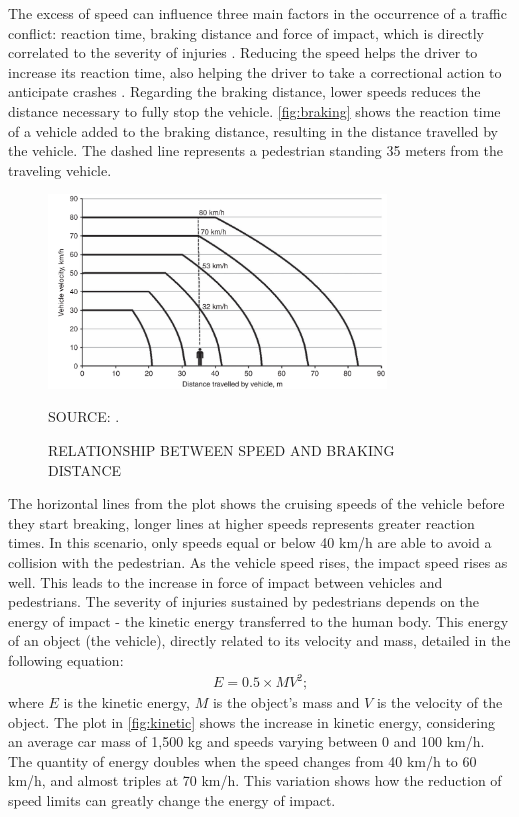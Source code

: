 The excess of speed can influence three main factors in the occurrence of a traffic conflict: reaction time, braking distance and force of impact, which is directly correlated to the severity of injuries \cite{Mohan2016a}. Reducing the speed helps the driver to increase its reaction time, also helping the driver to take a correctional action to anticipate crashes \cite{Elvik2009}. Regarding the braking distance, lower speeds reduces the distance necessary to fully stop the vehicle. \autoref{fig:braking} shows the reaction time of a vehicle added to the braking distance, resulting in the distance travelled by the vehicle. The dashed line represents a pedestrian standing 35 meters from the traveling vehicle. 

\begin{figure}[!htbp]
    \centering\footnotesize
    \captionsetup{font=footnotesize}
    \caption{RELATIONSHIP BETWEEN SPEED AND BRAKING DISTANCE}
    \includegraphics[width=0.8\textwidth]{fig/braking2.png}
    \label{fig:braking}
    \par SOURCE: \textcite{Mohan2016a}.
\end{figure} 

The horizontal lines from the plot shows the cruising speeds of the vehicle before they start breaking, longer lines at higher speeds represents greater reaction times. In this scenario, only speeds equal or below 40 km/h are able to avoid a collision with the pedestrian. As the vehicle speed rises, the impact speed rises as well. This leads to the increase in force of impact between vehicles and pedestrians. The severity of injuries sustained by pedestrians depends on the energy of impact - the kinetic energy transferred to the human body. This energy of an object (the vehicle), directly related to its velocity and mass, detailed in the following equation: \begin{align}
    E = 0.5 \times MV^2 \mbox{;}
    \label{eq:energy}
\end{align} where $E$ is the kinetic energy, $M$ is the object's mass and $V$ is the velocity of the object. The plot in \autoref{fig:kinetic} shows the increase in kinetic energy, considering an average car mass of 1,500 kg \cite{Zervas2008} and speeds varying between 0 and 100 km/h. The quantity of energy doubles when the speed changes from 40 km/h to 60 km/h, and almost triples at 70 km/h. This variation shows how the reduction of speed limits can greatly change the energy of impact.


